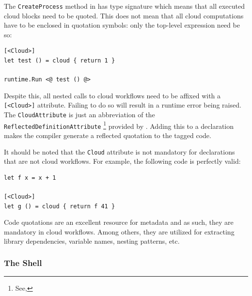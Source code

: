 The \texttt{CreateProcess} method in \mbrace{} has type signature
which means that all executed cloud blocks need to be quoted.
This does not mean that all cloud computations have to be enclosed in quotation symbols:
only the top-level expression need be so:
\begin{lstlisting}
[<Cloud>]
let test () = cloud { return 1 }

runtime.Run <@ test () @>
\end{lstlisting}

Despite this, all nested calls to cloud workflows need to be affixed with a \texttt{[<Cloud>]}
attribute. Failing to do so will result in a runtime error being raised.
The \texttt{CloudAttribute} is just an abbreviation of the \texttt{ReflectedDefinitionAttribute}%
\footnote{See, }
provided by \fsharp{}. Adding this to a declaration makes the \fsharp{} compiler generate a 
reflected quotation to the tagged code.

It should be noted that the \texttt{Cloud} attribute is not mandatory for \fsharp{} declarations that
are not cloud workflows. For example, the following code is perfectly valid:
\begin{lstlisting}
let f x = x + 1

[<Cloud>]
let g () = cloud { return f 41 }
\end{lstlisting}

Code quotations are an excellent resource for metadata and as such, they are mandatory
in cloud workflows. Among others, they are utilized for extracting library dependencies,
variable names, nesting patterns, etc.

\subsubsection*{The \TitularMbrace{} Shell}

